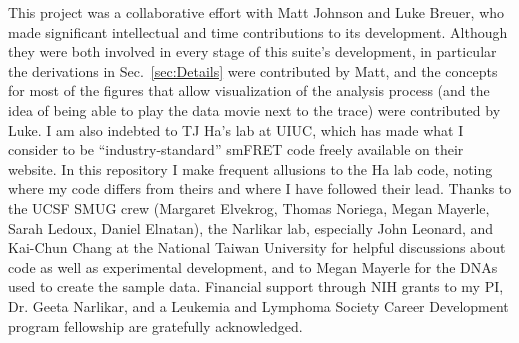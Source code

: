\documentclass[11pt]{article}
\begin{document}
This project was a collaborative effort with Matt Johnson and Luke Breuer, who made significant intellectual and time contributions to its development.  Although they were both involved in every stage of this suite's development, in particular the derivations in Sec.~\ref{sec:Details} were contributed by Matt, and the concepts for most of the figures that allow visualization of the analysis process (and the idea of being able to play the data movie next to the trace) were contributed by Luke.  I am also indebted to TJ Ha's lab at UIUC, which has made what I consider to be ``industry-standard'' smFRET code freely available on their website. In this repository I make frequent allusions to the Ha lab code, noting where my code differs from theirs and where I have followed their lead. Thanks to the UCSF SMUG crew (Margaret Elvekrog, Thomas Noriega, Megan Mayerle, Sarah Ledoux, Daniel Elnatan), the Narlikar lab, especially John Leonard, and Kai-Chun Chang at the National Taiwan University for helpful discussions about code as well as experimental development, and to Megan Mayerle for the DNAs used to create the sample data.  Financial support through NIH grants to my PI, Dr. Geeta Narlikar, and a Leukemia and Lymphoma Society Career Development program fellowship are gratefully acknowledged.


\end{document}
